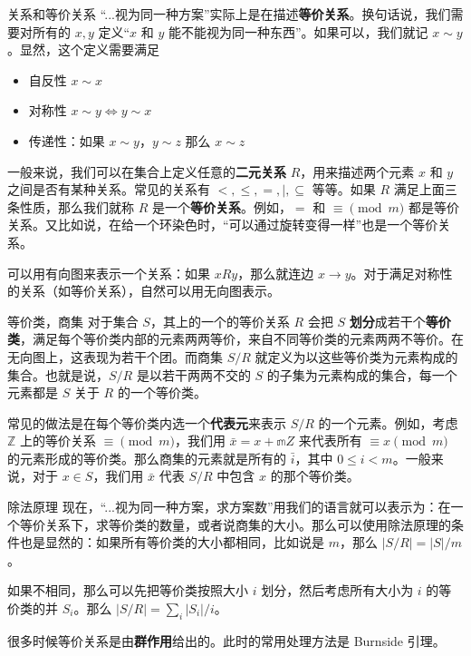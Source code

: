 \begin{frame}{关系和等价关系}
    “...视为同一种方案”实际上是在描述\textbf{等价关系}。换句话说，我们需要对所有的 $x,y$ 定义“$x$ 和 $y$ 能不能视为同一种东西”。如果可以，我们就记 $x\sim y$。显然，这个定义需要满足
    \begin{itemize}
        \item 自反性 $x\sim x$
        \item 对称性 $x\sim y\Longleftrightarrow y\sim x$
        \item 传递性：如果 $x\sim y$，$y\sim z$ 那么 $x\sim z$
    \end{itemize}

    一般来说，我们可以在集合上定义任意的\textbf{二元关系} $R$，用来描述两个元素 $x$ 和 $y$ 之间是否有某种关系。常见的关系有 $<,\le ,=,|,\subseteq$ 等等。如果 $R$ 满足上面三条性质，那么我们就称 $R$ 是一个\textbf{等价关系}。例如，$=$ 和 $\equiv \pmod m$ 都是等价关系。又比如说，在给一个环染色时，“可以通过旋转变得一样”也是一个等价关系。

    可以用有向图来表示一个关系：如果 $xRy$，那么就连边 $x\to y$。对于满足对称性的关系（如等价关系），自然可以用无向图表示。
\end{frame}
\begin{frame}{等价类，商集}
    对于集合 $S$，其上的一个的等价关系 $R$ 会把 $S$ \textbf{划分}成若干个\textbf{等价类}，满足每个等价类内部的元素两两等价，来自不同等价类的元素两两不等价。在无向图上，这表现为若干个团。而商集 $S/R$ 就定义为以这些等价类为元素构成的集合。也就是说，$S/R$ 是以若干两两不交的 $S$ 的子集为元素构成的集合，每一个元素都是 $S$ 关于 $R$ 的一个等价类。

    常见的做法是在每个等价类内选一个\textbf{代表元}来表示 $S/R$ 的一个元素。例如，考虑 $\mathbb Z$ 上的等价关系 $\equiv\pmod m$，我们用 $\bar x=x+\mathbb mZ$ 来代表所有 $\equiv x\pmod m$ 的元素形成的等价类。那么商集的元素就是所有的 $\bar i$，其中 $0\le i<m$。一般来说，对于 $x\in S$，我们用 $\bar x$ 代表 $S/R$ 中包含 $x$ 的那个等价类。
\end{frame}
\begin{frame}{除法原理}
    现在，“...视为同一种方案，求方案数”用我们的语言就可以表示为：在一个等价关系下，求等价类的数量，或者说商集的大小。那么可以使用除法原理的条件也是显然的：如果所有等价类的大小都相同，比如说是 $m$，那么 $|S/R|=|S|/m$。

    如果不相同，那么可以先把等价类按照大小 $i$ 划分，然后考虑所有大小为 $i$ 的等价类的并 $S_i$。那么 $|S/R|=\sum_i |S_i|/i$。

    很多时候等价关系是由\textbf{群作用}给出的。此时的常用处理方法是 Burnside 引理。
\end{frame}

